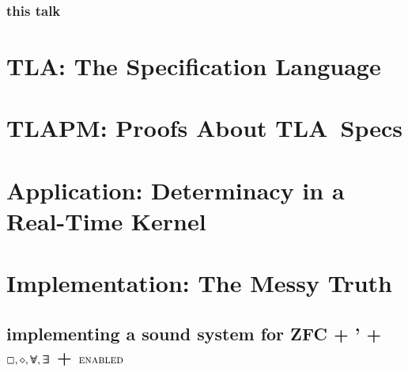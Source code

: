 \documentclass[xcolor=dvipsnames]{beamer}
\newcommand{\tla}{\textsc{TLA}}
\newcommand{\tempA}{\forall \hspace{-4.5pt} \forall}
\newcommand{\tempE}{\exists \hspace{-4.5pt} \exists}
\newcommand{\enabled}{\textsc{enabled}}
\newcommand{\myframe}[2]{
\begin{frame}
\frametitle{\color{Maroon}\normalsize #1\color{black}}
\small #2 
\end{frame}}
\begin{document}
\myframe{\hfill this talk}
{
\tableofcontents
}


\section{\tla: The Specification Language}


\section{\tla PM: Proofs About \tla\ Specs}



\section{Application: Determinacy in a Real-Time Kernel}



\section{Implementation: The Messy Truth \hspace{34pt}}
\subsection{ implementing a sound system for ZFC + ' + $\Box, \diamond, \tempA, \tempE$ + 
$\enabled$}

\end{document}
